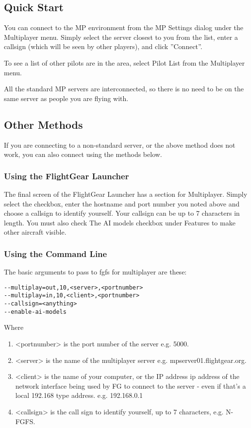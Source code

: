 \subsection{Quick Start}

You can connect to the MP environment from the MP Settings dialog under the Multiplayer menu. Simply select the
server closest to you from the list, enter a callsign (which will be seen by other players), and click
''Connect''. 

To see a list of other pilots are in the area, select Pilot List from the Multiplayer menu.

All the standard MP servers are interconnected, so there is no need to be on the same server as people you are flying with.

\subsection{Other Methods}

If you are connecting to a non-standard server, or the above method does not work, you can also connect
using the methods below.

\subsubsection{Using the FlightGear Launcher}

The final screen of the FlightGear Launcher has a section for Multiplayer.
Simply select the checkbox, enter the hostname and port
number you noted above and choose a callsign to identify yourself.
Your callsign can be up to 7 characters in length.
You must also check The AI models checkbox under Features to make other aircraft visible.

\subsubsection{Using the Command Line}

The basic arguments to pass to fgfs for multiplayer are these:

\begin{verbatim}
--multiplay=out,10,<server>,<portnumber>
--multiplay=in,10,<client>,<portnumber>
--callsign=<anything>
--enable-ai-models
\end{verbatim}

Where
\begin{enumerate}
\item <portnumber> is the port number of the server e.g. 5000.
\item <server> is the name of the multiplayer server e.g. mpserver01.flightgear.org.
\item <client> is the name of your computer, or the IP address ip address of the network interface being
used by FG to connect to the server - even if that's a local 192.168 type address. e.g. 192.168.0.1
\item <callsign> is the call sign to identify yourself, up to 7 characters, e.g. N-FGFS.
\end{enumerate}

